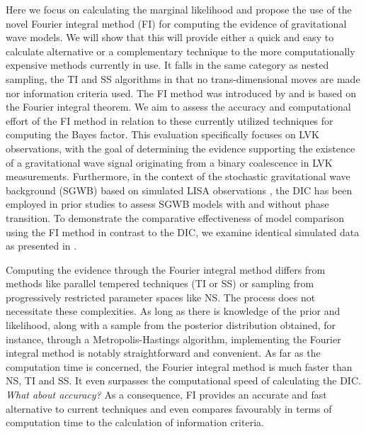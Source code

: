 \documentclass[%
 reprint,
 amsmath,amssymb,
 aps,
]{revtex4-2}
\begin{document}
Here we focus on calculating the marginal likelihood and propose the use of the novel Fourier integral method (FI) for computing the evidence of  gravitational wave models. We will show that this will provide either a quick and easy to calculate alternative or a complementary technique to the more computationally expensive methods currently in use. 
It falls in the same category as nested sampling, the TI and SS algorithms in that no trans-dimensional moves are made nor information criteria used.
The FI method was introduced by \cite{rotiroti2022computing} and is based on the Fourier integral theorem.
We aim to assess the accuracy and computational effort of the FI method in relation to these currently utilized techniques for computing the Bayes factor. This evaluation specifically focuses on LVK observations, with the goal of determining the evidence supporting the existence of a gravitational wave signal originating from a binary coalescence in LVK measurements.
Furthermore, in the context of the stochastic gravitational wave background (SGWB) based on simulated LISA observations \cite{BoileauGuillaume2023PfLt},
the DIC has been employed in prior studies to assess SGWB models with and without phase transition. To demonstrate the comparative effectiveness of model comparison using the FI method in contrast to the DIC, we examine identical simulated data as presented in \cite{BoileauGuillaume2023PfLt}.

Computing the evidence through the Fourier integral method differs from methods like parallel tempered techniques (TI or SS) or sampling from progressively restricted parameter spaces like NS. The process does not necessitate these complexities. As long as there is knowledge of the prior and likelihood, along with a sample from the posterior distribution obtained, for instance, through a Metropolis-Hastings algorithm, implementing the Fourier integral method is notably straightforward and convenient. As far as the computation time is concerned,  the Fourier integral method is much faster than NS, TI and SS.  It even  surpasses the computational speed of calculating the DIC. {\em What about accuracy?} As a consequence,
FI provides an accurate and fast alternative to current techniques and even compares favourably in terms of computation time to the calculation of information criteria.
\end{document}
